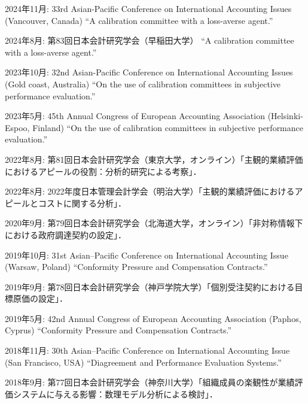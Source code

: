 \documentclass[letterpaper,uplatex]{article}
\renewenvironment{itemize}{
  \begin{list}{}{
    \setlength{\leftmargin}{1.5em}
  }
}{
  \end{list}
}
\begin{document}
\begin{itemize}
    \item 2024年11月: 33rd Asian-Pacific Conference on International Accounting Issues (Vancouver, Canada) ``A calibration committee with a loss-averse agent.''
    
    \item 2024年8月:  第83回日本会計研究学会（早稲田大学） ``A calibration committee with a loss-averse agent.''

    \item 2023年10月: 32nd Asian-Pacific Conference on International Accounting Issues (Gold coast, Australia) ``On the use of calibration committees in subjective performance evaluation.''

    \item 2023年5月: 45th Annual Congress of European Accounting Association (Helsinki-Espoo, Finland) ``On the use of calibration committees in subjective performance evaluation.''
    
    \item 2022年8月: 第81回日本会計研究学会（東京大学，オンライン）「主観的業績評価におけるアピールの役割：分析的研究による考察」．
    
   \item 2022年8月: 2022年度日本管理会計学会（明治大学）「主観的業績評価におけるアピールとコストに関する分析」．

  \item 2020年9月: 第79回日本会計研究学会（北海道大学，オンライン）「非対称情報下における政府調達契約の設定」．
  
  \item 2019年10月: 31st Asian--Pacific Conference on International Accounting Issue (Warsaw, Poland) ``Conformity Pressure and Compensation Contracts.''

  \item 2019年9月: 第78回日本会計研究学会（神戸学院大学）「個別受注契約における目標原価の設定」．

  \item 2019年5月: 42nd Annual Congress of European Accounting Association (Paphos, Cyprus) ``Conformity Pressure and Compensation Contracts.''

  \item 2018年11月: 30th Asian--Pacific Conference on International Accounting Issue (San Francisco, USA) ``Diagreement and Performance Evaluation Systems.''

  \item 2018年9月: 第77回日本会計研究学会（神奈川大学）「組織成員の楽観性が業績評価システムに与える影響：数理モデル分析による検討」．


\end{itemize}
\end{document}
